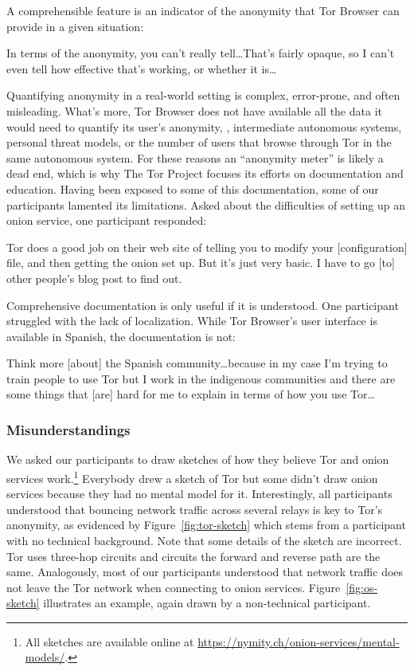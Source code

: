 A comprehensible feature is an indicator of the anonymity that Tor Browser can
provide in a given situation:

\begin{displayquote}
In terms of the anonymity, you can't really tell\dots That's fairly opaque, so I
can't even tell how effective that's working, or whether it is\dots
\end{displayquote}

Quantifying anonymity in a real-world setting is complex, error-prone, and often
misleading.  What's more, Tor Browser does not have available all the data it
would need to quantify its user's anonymity, \eg, intermediate autonomous
systems, personal threat models, or the number of users that browse through Tor
in the same autonomous system.  For these reasons an ``anonymity meter'' is
likely a dead end, which is why The Tor Project focuses its efforts on
documentation and education.  Having been exposed to some of this documentation,
some of our participants lamented its limitations.  Asked about the difficulties
of setting up an onion service, one participant responded:

\begin{displayquote}
Tor does a good job on their web site of telling you to modify your
[configuration] file, and then getting the onion set up.  But it's just very
basic.  I have to go [to] other people's blog post to find out.
\end{displayquote}

Comprehensive documentation is only useful if it is understood.  One participant
struggled with the lack of localization.  While Tor Browser's user interface is
available in Spanish, the documentation is not:

\begin{displayquote}
Think more [about] the Spanish community\dots because in my case I'm trying to
train people to use Tor but I work in the indigenous communities and there are
some things that [are] hard for me to explain in terms of how you use Tor\dots
\end{displayquote}

\subsubsection{Misunderstandings}

We asked our participants to draw sketches of how they believe Tor and onion
services work.\footnote{All sketches are available online at
\url{https://nymity.ch/onion-services/mental-models/}.}   Everybody drew a
sketch of Tor but some didn't draw onion services because they had no mental
model for it.  Interestingly, all participants understood that bouncing network
traffic across several relays is key to Tor's anonymity, as evidenced by
Figure~\ref{fig:tor-sketch} which stems from a participant with no technical
background. Note that some details of the sketch are incorrect.  Tor uses
three-hop circuits and circuits the forward and reverse path are the same.
Analogously, most of our participants understood that network traffic does not
leave the Tor network when connecting to onion services.
Figure~\ref{fig:os-sketch} illustrates an example, again drawn by a
non-technical participant.

